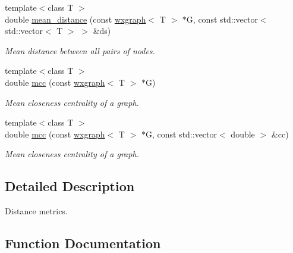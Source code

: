 \begin{DoxyCompactItemize}
{\footnotesize template$<$class T $>$ }\\double \hyperlink{namespacelgraph_1_1networks_1_1metrics_1_1distance_a9fac278edc61e5d86776b7243b6f793a}{mean\+\_\+distance} (const \hyperlink{classlgraph_1_1wxgraph}{wxgraph}$<$ T $>$ $\ast$G, const std\+::vector$<$ std\+::vector$<$ T $>$ $>$ \&ds)
\begin{DoxyCompactList}\small\item\em Mean distance between all pairs of nodes. \end{DoxyCompactList}\item 
{\footnotesize template$<$class T $>$ }\\double \hyperlink{namespacelgraph_1_1networks_1_1metrics_1_1distance_a48bdb12a1b0b452f68f8d84eea4ea9c8}{mcc} (const \hyperlink{classlgraph_1_1wxgraph}{wxgraph}$<$ T $>$ $\ast$G)
\begin{DoxyCompactList}\small\item\em Mean closeness centrality of a graph. \end{DoxyCompactList}\item 
{\footnotesize template$<$class T $>$ }\\double \hyperlink{namespacelgraph_1_1networks_1_1metrics_1_1distance_a917cd85d53ace1529957de1f73fa0e18}{mcc} (const \hyperlink{classlgraph_1_1wxgraph}{wxgraph}$<$ T $>$ $\ast$G, const std\+::vector$<$ double $>$ \&cc)
\begin{DoxyCompactList}\small\item\em Mean closeness centrality of a graph. \end{DoxyCompactList}\end{DoxyCompactItemize}


\subsection{Detailed Description}
Distance metrics. 

\subsection{Function Documentation}
\mbox{\label{namespacelgraph_1_1networks_1_1metrics_1_1distance_aece06d66c458437b25854dc04f317a9b}} 
